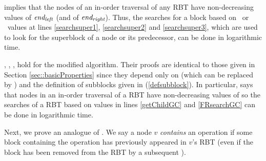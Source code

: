  implies that 
the nodes of an in-order traversal of any RBT have non-decreasing values of
$\mbox{\textit{end\textsubscript{left}}}$ (and of $\mbox{\textit{end\textsubscript{right}}}$).
Thus, the searches for a block based on \eleft\ or \eright\ values 
at lines \ref{searchsuper1}, \ref{searchsuper2} and \ref{searchsuper3},
which are used to look for the superblock of a node or its predecessor, can be done in logarithmic time.

, , ,  
hold for the modified algorithm.  Their proofs are identical to those given in 
Section \ref{sec::basicProperties} since they  depend only on  (which can be replaced by )
and the definition of subblocks given in (\ref{defsubblock}).
In particular,  says that nodes in an in-order traversal of a RBT have non-decreasing
values of   so the searches of a RBT based on
 values in lines
\ref{getChildGC} and \ref{FRsearchGC} can be done in logarithmic time.

Next, we prove an analogue of .
We say a node $v$ \emph{contains} an operation
if some block containing the operation has previously appeared in $v$'s RBT (even if 
the block has been removed from the RBT by a subsequent ).


